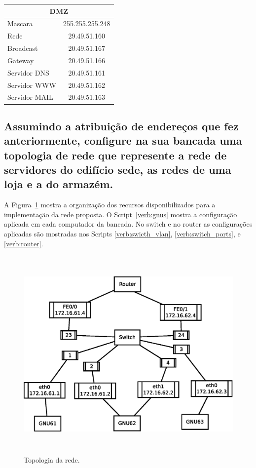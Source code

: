 \documentclass[a4paper,12pt]{article}
\begin{document}
\begin{center}
\begin{longtable}{ l | c }
   \multicolumn{2}{c}{DMZ} \\\hline 
   Mascara & 255.255.255.248 \\\hline
   Rede & 29.49.51.160 \\\hline 
   Broadcast & 20.49.51.167 \\\hline 
   Gateway & 20.49.51.166 \\\hline
   Servidor DNS & 20.49.51.161 \\\hline
   Servidor WWW & 20.49.51.162 \\\hline
   Servidor MAIL & 20.49.51.163 \\\hline
\end{longtable}
\end{center}

\subsection{Assumindo a atribuição de endereços que fez anteriormente, configure na sua
bancada uma topologia de rede que represente a rede de servidores do edifício
sede, as redes de uma loja e a do armazém.}

A Figura~\ref{fig:topologia} mostra a organização dos recursos disponibilizados
para a implementação da rede proposta. O Script~\ref{verb:gnus} mostra a configuração
aplicada em cada computador da bancada. No switch e no router as configurações
aplicadas são mostradas nos Scripts \ref{verb:swicth_vlan}, \ref{verb:switch_ports}, e \ref{verb:router}.

\begin{figure}[htp]
   \begin{center}
      \includegraphics[height=300pt]{topologia}
   \end{center}
   \caption{Topologia da rede.}
   \label{fig:topologia}
\end{figure}
\end{document}

